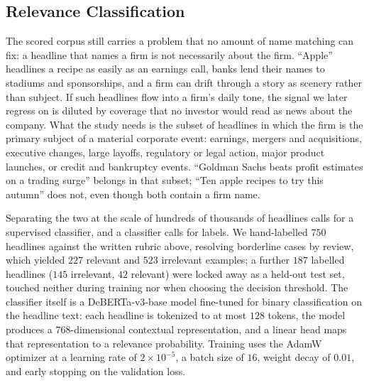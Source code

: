 \documentclass[conference]{IEEEtran}
\begin{document}
\subsection{Relevance Classification}
\label{sec:rc}
The scored corpus still carries a problem that no amount of name matching can fix: a
headline that names a firm is not necessarily about the firm. ``Apple'' headlines a
recipe as easily as an earnings call, banks lend their names to stadiums and
sponsorships, and a firm can drift through a story as scenery rather than subject.
If such headlines flow into a firm's daily tone, the signal we later regress on is
diluted by coverage that no investor would read as news about the company. What the
study needs is the subset of headlines in which the firm is the primary subject of a
material corporate event: earnings, mergers and acquisitions, executive changes,
large layoffs, regulatory or legal action, major product launches, or credit and
bankruptcy events. ``Goldman Sachs beats profit estimates on a trading surge''
belongs in that subset; ``Ten apple recipes to try this autumn'' does not, even
though both contain a firm name.

Separating the two at the scale of hundreds of thousands of headlines calls for a
supervised classifier, and a classifier calls for labels. We hand-labelled $750$
headlines against the written rubric above, resolving borderline cases by review,
which yielded $227$ relevant and $523$ irrelevant examples; a further $187$ labelled
headlines ($145$ irrelevant, $42$ relevant) were locked away as a held-out test set,
touched neither during training nor when choosing the decision threshold. The
classifier itself is a DeBERTa-v3-base model fine-tuned for binary classification on
the headline text: each headline is tokenized to at most $128$ tokens, the model
produces a $768$-dimensional contextual representation, and a linear head maps that
representation to a relevance probability. Training uses the AdamW optimizer at a
learning rate of $2\times10^{-5}$, a batch size of $16$, weight decay of $0.01$, and
early stopping on the validation loss.
\end{document}
